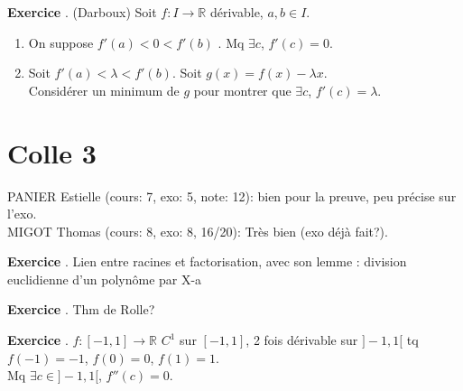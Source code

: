 \documentclass[10pt,a4paper]{article}
\newcounter{question}
\newcounter{exo}
\newenvironment{exo}{\vspace{0.5cm}\setcounter{question}{0}\addtocounter{exo}{1} \noindent \textbf{Exercice \theexo}. \normalsize }{\par}
\begin{document}
	\begin{exo}
		(Darboux) Soit $f : I \longrightarrow \mathbb{R}$ dérivable, $a, b \in I$.\\
		
		\begin{enumerate}
			\item On suppose $f'(a) < 0 < f'(b)$ . Mq $\exists c$, $f'(c) = 0$.
			\item Soit $f'(a) <  \lambda < f'(b)$. Soit $g(x) = f(x) - \lambda x$.\\
			Considérer un minimum de $g$ pour montrer que $\exists c$, $f'(c) = \lambda$.  
		\end{enumerate}	
	\end{exo}

	\section*{Colle 3}
	\setcounter{exo}{0}
	PANIER Estielle (cours: 7, exo: 5, note: 12): bien pour la preuve, peu précise sur l'exo.\\
	MIGOT Thomas (cours: 8, exo: 8, 16/20): Très bien (exo déjà fait?).\\
	
	\begin{exo}
		Lien entre racines et factorisation, avec son lemme : division euclidienne d'un polynôme par X-a
	\end{exo}		
	
	\begin{exo}
		Thm de Rolle?
	\end{exo}
	
	\begin{exo}
		$f : [-1, 1] \longrightarrow \mathbb{R}$ $C^1$ sur $[-1, 1]$, 2 fois dérivable sur $]-1, 1[$ tq $f(-1) = -1$, $f(0) = 0$, $f(1) = 1$.\\
		Mq $\exists c \in ]-1, 1[$, $f''(c) = 0$.
	\end{exo}	
\end{document}
